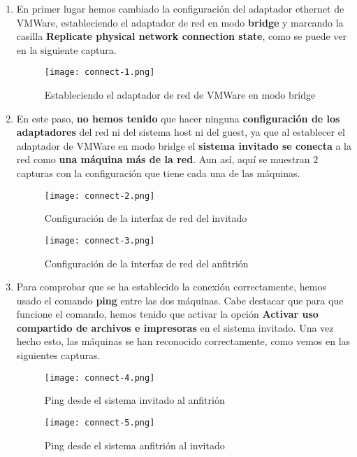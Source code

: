 \begin{enumerate}
    \item En primer lugar hemos cambiado la configuración del adaptador ethernet de VMWare, estableciendo el adaptador de red en modo \textbf{bridge} y marcando la casilla \textbf{Replicate physical network connection state}, como se puede ver en la siguiente captura.

    \begin{figure}[H]
        \centering
        \texttt{[image: connect-1.png]}
        \caption{Estableciendo el adaptador de red de VMWare en modo bridge}
    \end{figure}

    \item En este paso, \textbf{no hemos tenido} que hacer ninguna \textbf{configuración de los adaptadores} del red ni del sistema host ni del guest, ya que al establecer el adaptador de VMWare en modo bridge el \textbf{sistema invitado se conecta} a la red como \textbf{una máquina más de la red}. Aun así, aquí se muestran 2 capturas con la configuración que tiene cada una de las máquinas.

    \begin{figure}[H]
        \centering
        \texttt{[image: connect-2.png]}
        \caption{Configuración de la interfaz de red del invitado}
    \end{figure}

    \begin{figure}[H]
        \centering
        \texttt{[image: connect-3.png]}
        \caption{Configuración de la interfaz de red del anfitrión}
    \end{figure}

    \item Para comprobar que se ha establecido la conexión correctamente, hemos usado el comando \textbf{ping} entre las dos máquinas. Cabe destacar que para que funcione el comando, hemos tenido que activar la opción \textbf{Activar uso compartido de archivos e impresoras} en el sistema invitado. Una vez hecho esto, las máquinas se han reconocido correctamente, como vemos en las siguientes capturas.

    \begin{figure}[H]
        \centering
        \texttt{[image: connect-4.png]}
        \caption{Ping desde el sistema invitado al anfitrión}
    \end{figure}

    \begin{figure}[H]
        \centering
        \texttt{[image: connect-5.png]}
        \caption{Ping desde el sistema anfitrión al invitado}
    \end{figure}


\end{enumerate}
